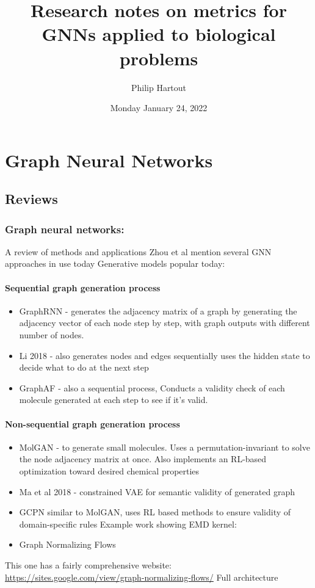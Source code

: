 \documentclass[12pt]{article}
\author{Philip Hartout}
\date{Monday January 24, 2022}
\title{Research notes on metrics for GNNs applied to biological problems}
\begin{document}
\maketitle

\section{Graph Neural Networks}
\label{sec:org0a12569}
\subsection{Reviews}
\label{sec:org2845576}
\subsubsection{Graph neural networks:}
\label{sec:org4c781ce}
    A review of methods and applications
Zhou et al mention several GNN approaches in use today
Generative models popular today:
\paragraph{Sequential graph generation process}
\label{sec:org38c0b05}
\begin{itemize}
\item GraphRNN - generates the adjacency matrix of a graph by generating the adjacency vector of each node step by step, with graph outputs with different number of nodes.
\item Li 2018 - also generates nodes and edges sequentially uses the hidden state to decide what to do at the next step
\item GraphAF - also a sequential process, Conducts a validity check of each molecule generated at each step to see if it's valid.
\end{itemize}
\paragraph{Non-sequential graph generation process}
\label{sec:orgf1af366}
\begin{itemize}
\item MolGAN - to generate small molecules. Uses a permutation-invariant to solve the node adjacency matrix at once. Also implements an RL-based optimization toward desired chemical properties
\item Ma et al 2018 - constrained VAE for semantic validity of generated graph
\item GCPN similar to MolGAN, uses RL based methods to ensure validity of domain-specific rules Example work showing EMD kernel:
\item Graph Normalizing Flows
\end{itemize}
This one has a fairly comprehensive website: \url{https://sites.google.com/view/graph-normalizing-flows/}
Full architecture
\end{document}
